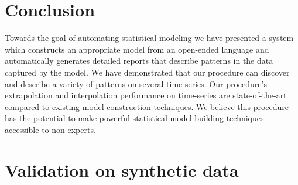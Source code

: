 \section{Conclusion}

Towards the goal of automating statistical modeling we have presented a system which constructs an appropriate model from an open-ended language and automatically generates detailed reports that describe patterns in the data captured by the model.
We have demonstrated that our procedure can discover and describe a variety of patterns on several time series.
Our procedure's extrapolation and interpolation performance on time-series are state-of-the-art compared to existing model construction techniques.
We believe this procedure has the potential to make powerful statistical model-building techniques accessible to non-experts.









\section{Validation on synthetic data}
\label{sec:synthetic}

